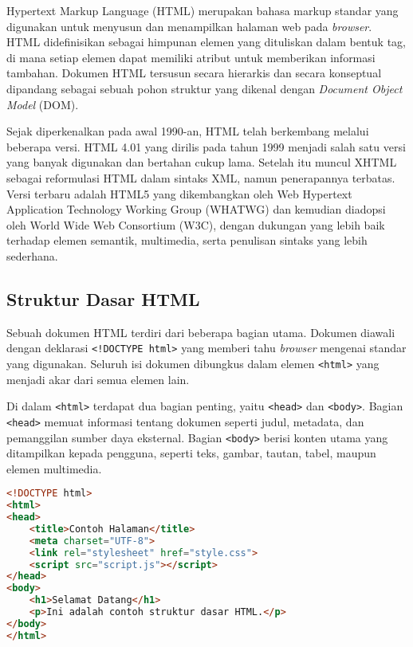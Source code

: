 
Hypertext Markup Language (HTML) merupakan bahasa markup standar yang digunakan untuk menyusun dan menampilkan halaman web pada \textit{browser}. HTML didefinisikan sebagai himpunan elemen yang dituliskan dalam bentuk tag, di mana setiap elemen dapat memiliki atribut untuk memberikan informasi tambahan. Dokumen HTML tersusun secara hierarkis dan secara konseptual dipandang sebagai sebuah pohon struktur yang dikenal dengan \textit{Document Object Model} (DOM).

Sejak diperkenalkan pada awal 1990-an, HTML telah berkembang melalui beberapa versi. HTML 4.01 yang dirilis pada tahun 1999 menjadi salah satu versi yang banyak digunakan dan bertahan cukup lama. Setelah itu muncul XHTML sebagai reformulasi HTML dalam sintaks XML, namun penerapannya terbatas. Versi terbaru adalah HTML5 yang dikembangkan oleh Web Hypertext Application Technology Working Group (WHATWG) dan kemudian diadopsi oleh World Wide Web Consortium (W3C), dengan dukungan yang lebih baik terhadap elemen semantik, multimedia, serta penulisan sintaks yang lebih sederhana.

\subsection{Struktur Dasar HTML}
\label{subsec:0224-struktur-dasar-html}

Sebuah dokumen HTML terdiri dari beberapa bagian utama. Dokumen diawali dengan deklarasi \texttt{<!DOCTYPE html>} yang memberi tahu \textit{browser} mengenai standar yang digunakan. Seluruh isi dokumen dibungkus dalam elemen \texttt{<html>} yang menjadi akar dari semua elemen lain.  

Di dalam \texttt{<html>} terdapat dua bagian penting, yaitu \texttt{<head>} dan \texttt{<body>}. Bagian \texttt{<head>} memuat informasi tentang dokumen seperti judul, metadata, dan pemanggilan sumber daya eksternal. Bagian \texttt{<body>} berisi konten utama yang ditampilkan kepada pengguna, seperti teks, gambar, tautan, tabel, maupun elemen multimedia.  


\begin{lstlisting}[language=HTML, caption={Struktur dasar dokumen HTML}, label={lst:html-basic-structure}]
<!DOCTYPE html>
<html>
<head>
    <title>Contoh Halaman</title>
    <meta charset="UTF-8">
    <link rel="stylesheet" href="style.css">
    <script src="script.js"></script>
</head>
<body>
    <h1>Selamat Datang</h1>
    <p>Ini adalah contoh struktur dasar HTML.</p>
</body>
</html>
\end{lstlisting}

